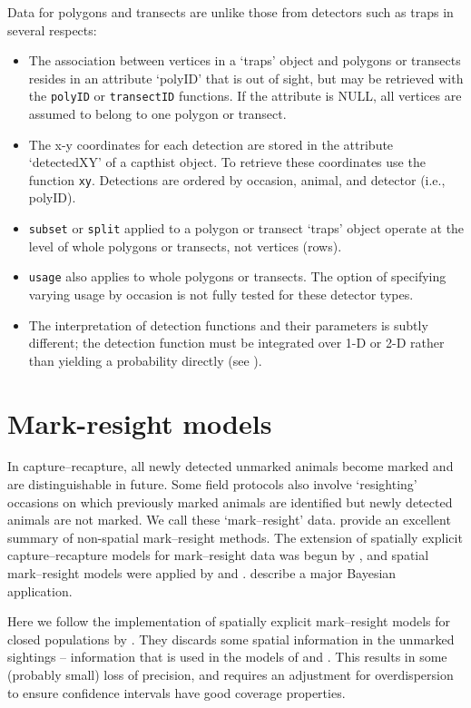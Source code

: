 \documentclass[
]{book}
\begin{document}
Data for polygons and transects are unlike those from detectors such as traps in several respects:

\begin{itemize}
\item
  The association between vertices in a `traps' object and polygons or transects resides in an attribute `polyID' that is out of sight, but may be retrieved with the \texttt{polyID} or \texttt{transectID} functions. If the attribute is NULL, all vertices are assumed to belong to one polygon or transect.
\item
  The x-y coordinates for each detection are stored in the attribute `detectedXY' of a capthist object. To retrieve these
  coordinates use the function \texttt{xy}. Detections are ordered by occasion, animal, and detector (i.e., polyID).
\item
  \texttt{subset} or \texttt{split} applied to a polygon or transect `traps' object operate at the level of whole polygons or transects, not vertices (rows).
\item
  \texttt{usage} also applies to whole polygons or transects. The option of specifying varying usage by occasion is not fully tested for these detector types.
\item
  The interpretation of detection functions and their parameters is subtly different; the detection function must be integrated over 1-D or 2-D rather than yielding a probability directly (see \citet{e11}).
\end{itemize}

\chapter{Mark-resight models}\label{mark-resight}

In capture--recapture, all newly detected unmarked animals become marked and are distinguishable in future. Some field protocols also involve `resighting' occasions on which previously marked animals are identified but newly detected animals are not marked. We call these `mark--resight' data. \citet{mw12} provide an excellent summary of non-spatial mark--resight methods. The extension of spatially explicit capture--recapture models for mark--resight data was begun by \citet{sgpsmspo13}, and spatial mark--resight models were applied by \citet{rksnmapdbed14} and \citet{rswmd15}. \citet{whc18} describe a major Bayesian application.

Here we follow the implementation of spatially explicit mark--resight models for closed populations by \citet{eh18}. They discards some spatial information in the unmarked sightings -- information that is used in the models of \citet{cr13} and \citet{sgpsmspo13}. This results in some (probably small) loss of precision, and requires an adjustment for overdispersion to ensure confidence intervals have good coverage properties.
\end{document}
